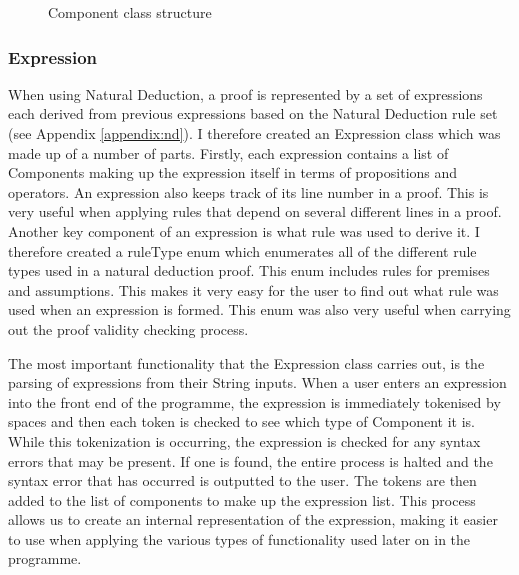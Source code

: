 \begin{figure}[!ht]
	\centering
	\caption{Component class structure}
\end{figure}

\subsubsection{Expression}

When using Natural Deduction, a proof is represented by a set of expressions each derived from previous expressions based on the Natural Deduction rule set (see Appendix \ref{appendix:nd}). I therefore created an Expression class which was made up of a number of parts. Firstly, each expression contains a list of Components making up the expression itself in terms of propositions and operators. An expression also keeps track of its line number in a proof. This is very useful when applying rules that depend on several different lines in a proof. Another key component of an expression is what rule was used to derive it. I therefore created a ruleType enum which enumerates all of the different rule types used in a natural deduction proof. This enum includes rules for premises and assumptions. This makes it very easy for the user to find out what rule was used when an expression is formed. This enum was also very useful when carrying out the proof validity checking process.

The most important functionality that the Expression class carries out, is the parsing of expressions from their String inputs. When a user enters an expression into the front end of the programme,  the expression is immediately tokenised by spaces and then each token is checked to see which type of Component it is. While this tokenization is occurring, the expression is checked for any syntax errors that may be present. If one is found, the entire process is halted and the syntax error that has occurred is outputted to the user. The tokens are then added to the list of components to make up the expression list. This process allows us to create an internal representation of the expression, making it easier to use when applying the various types of functionality used later on in the programme. 

